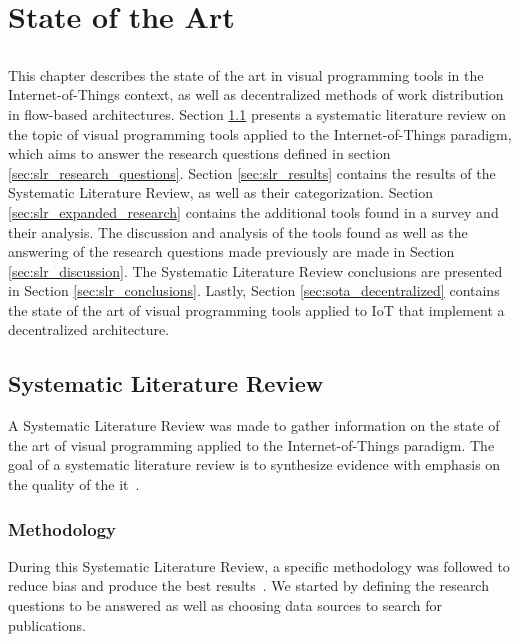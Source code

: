 \chapter{State of the Art} \label{chap:sota} \minitoc

\section*{}


This chapter describes the state of the art in visual programming tools in the Internet-of-Things context, as well as decentralized methods of work distribution in flow-based architectures. Section \ref{sec:slr} presents a systematic literature review on the topic of visual programming tools applied to the Internet-of-Things paradigm, which aims to answer the research questions defined in section \ref{sec:slr_research_questions}. Section \ref{sec:slr_results} contains the results of the Systematic Literature Review, as well as their categorization. Section \ref{sec:slr_expanded_research} contains the additional tools found in a survey and their analysis. The discussion and analysis of the tools found as well as the answering of the research questions made previously are made in Section \ref{sec:slr_discussion}. The Systematic Literature Review conclusions are presented in Section \ref{sec:slr_conclusions}. Lastly, Section \ref{sec:sota_decentralized} contains the state of the art of visual programming tools applied to IoT that implement a decentralized architecture.

\section{Systematic Literature Review}\label{sec:slr}

A Systematic Literature Review was made to gather information on the state of the art of visual programming applied to the Internet-of-Things paradigm. The goal of a systematic literature review is to synthesize evidence with emphasis on the quality of the it~\cite{SLR_guidelines}.

\subsection{Methodology}\label{sec:methodology}

During this Systematic Literature Review, a specific methodology was followed to reduce bias and produce the best results~\cite{SLR_guidelines}.
We started by defining the research questions to be answered as well as choosing data sources to search for publications.

